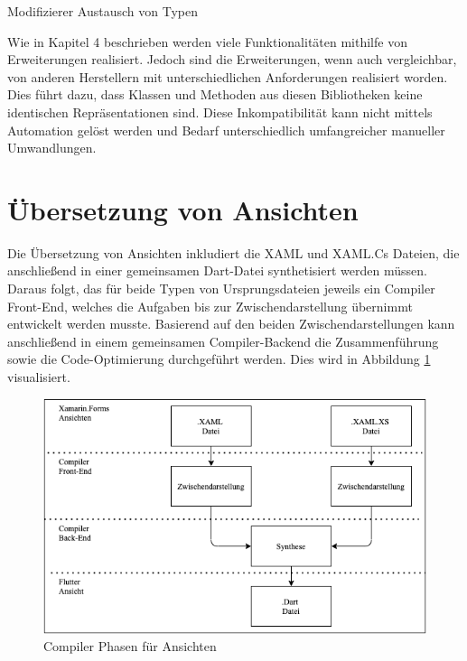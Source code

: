 





Modifizierer
Austausch von Typen

Wie in Kapitel 4 beschrieben werden viele Funktionalitäten mithilfe von Erweiterungen realisiert.  Jedoch sind die Erweiterungen, wenn auch vergleichbar, von anderen Herstellern mit unterschiedlichen Anforderungen realisiert worden.  Dies führt dazu,  dass Klassen und Methoden aus diesen Bibliotheken keine identischen Repräsentationen sind.  Diese Inkompatibilität kann nicht mittels Automation gelöst werden und Bedarf  unterschiedlich umfangreicher manueller Umwandlungen.  


\section{Übersetzung von Ansichten}
Die Übersetzung von Ansichten inkludiert die XAML und XAML.Cs Dateien, die anschließend in einer gemeinsamen Dart-Datei synthetisiert werden müssen.  Daraus folgt,  das für beide Typen von Ursprungsdateien jeweils ein Compiler Front-End,  welches die Aufgaben bis zur Zwischendarstellung übernimmt entwickelt werden musste.  Basierend auf den beiden Zwischendarstellungen kann anschließend in einem gemeinsamen Compiler-Backend die Zusammenführung sowie die Code-Optimierung durchgeführt werden.  Dies wird in Abbildung  \ref{fig:ViewCompilerPhases} visualisiert. 

\begin{figure}[!ht]
 \includegraphics[width=\textwidth,keepaspectratio]{Images/Implementation/ViewCompiler.png}
 \caption{Compiler Phasen für Ansichten}
 \label{fig:ViewCompilerPhases}
\end{figure}

